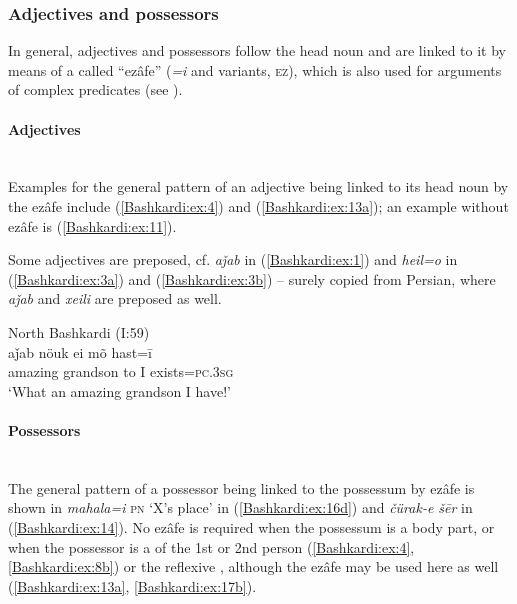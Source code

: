 \documentclass[output=paper,colorlinks,citecolor=brown]{langscibook}
\begin{document}
\subsubsection{Adjectives and possessors}\label{Bashkardi:ss:2.1.1}

In general, adjectives and possessors follow the head noun and are linked to it by means of a  called ``ezâfe'' (\textit{=i }and variants, \textsc{ez}), which is also used for arguments of complex predicates (see ).

\paragraph{Adjectives}\label{Bashkardi:ss:2.1.1.1}\mbox{}\\

{\noindent}Examples for the general pattern of an adjective being linked to its head noun by the ezâfe include (\ref{Bashkardi:ex:4}) and (\ref{Bashkardi:ex:13a}); an example without ezâfe is (\ref{Bashkardi:ex:11}).

Some adjectives are preposed, cf. \textit{aǰab} in (\ref{Bashkardi:ex:1}) and \textit{heil=o} in (\ref{Bashkardi:ex:3a}) and (\ref{Bashkardi:ex:3b}) – surely copied from Persian, where \textit{aǰab} and \textit{xeili} are preposed as well.

\ea\label{Bashkardi:ex:1}
North Bashkardi (I:59) \\
\gll aǰab nöuk ei mõ hast=ī \\
amazing grandson to I exists=\textsc{pc.3sg} \\
\glt `What an amazing grandson I have!' 
\z

\paragraph{Possessors}\label{Bashkardi:ss:2.1.1.2}\mbox{}\\

{\noindent}The general pattern of a possessor being linked to the possessum by ezâfe is shown in \textit{mahala=i} \textsc{pn} `X's place' in (\ref{Bashkardi:ex:16d}) and \textit{čürak-e šēr} in (\ref{Bashkardi:ex:14}). No ezâfe is required when the possessum is a body part, or when the possessor is a  of the 1st or 2nd person (\ref{Bashkardi:ex:4}, \ref{Bashkardi:ex:8b}) or the reflexive , although the ezâfe may be used here as well (\ref{Bashkardi:ex:13a}, \ref{Bashkardi:ex:17b}).
\end{document}
